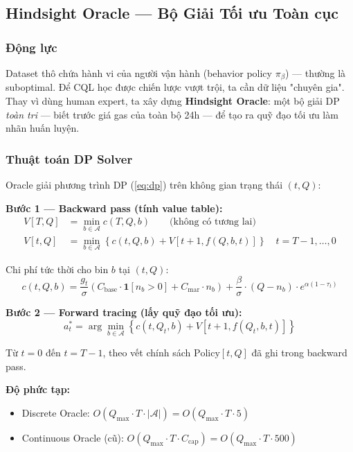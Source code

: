 \subsection{Hindsight Oracle — Bộ Giải Tối ưu Toàn cục}

\subsubsection{Động lực}

Dataset thô chứa hành vi của người vận hành (behavior policy $\pi_\beta$) — thường là suboptimal. Để CQL học được chiến lược vượt trội, ta cần dữ liệu "chuyên gia". Thay vì dùng human expert, ta xây dựng \textbf{Hindsight Oracle}: một bộ giải DP \textit{toàn tri} — biết trước giá gas của toàn bộ 24h — để tạo ra quỹ đạo tối ưu làm nhãn huấn luyện.

\subsubsection{Thuật toán DP Solver}

Oracle giải phương trình DP (\ref{eq:dp}) trên không gian trạng thái $(t, Q)$:

\vspace{0.5em}\noindent\textbf{Bước 1 — Backward pass (tính value table):}
\begin{align}
    V[T,Q] &= \min_{b\in\mathcal{A}} c(T, Q, b) \quad\quad\text{(không có tương lai)} \\
    V[t,Q] &= \min_{b\in\mathcal{A}} \left\{c(t, Q, b) + V[t+1, f(Q,b,t)]\right\} \quad t = T-1,\ldots,0
\end{align}

Chi phí tức thời cho bin $b$ tại $(t, Q)$:
\begin{equation}
    c(t,Q,b) = \frac{g_t}{\sigma}\!\left(C_{\text{base}}\!\cdot\!\mathbf{1}[n_b>0] + C_{\text{mar}}\!\cdot\! n_b\right) + \frac{\beta}{\sigma}\cdot(Q-n_b)\cdot e^{\alpha(1-\tau_t)}
\end{equation}

\vspace{0.5em}\noindent\textbf{Bước 2 — Forward tracing (lấy quỹ đạo tối ưu):}
\begin{equation}
    a^*_t = \arg\min_{b\in\mathcal{A}} \left\{c(t, Q_t, b) + V[t+1, f(Q_t, b, t)]\right\}
\end{equation}

Từ $t=0$ đến $t=T-1$, theo vết chính sách $\text{Policy}[t,Q]$ đã ghi trong backward pass.

\vspace{0.5em}\noindent\textbf{Độ phức tạp:}
\begin{itemize}
    \item Discrete Oracle: $O(Q_{\max}\cdot T\cdot|\mathcal{A}|) = O(Q_{\max}\cdot T\cdot 5)$
    \item Continuous Oracle (cũ): $O(Q_{\max}\cdot T\cdot C_{\text{cap}}) = O(Q_{\max}\cdot T\cdot 500)$
\end{itemize}

